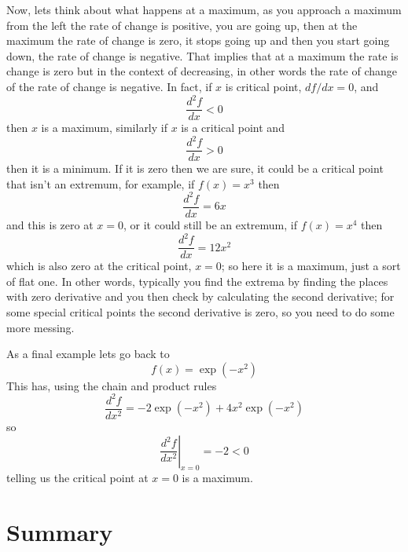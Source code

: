 \documentclass[12pt]{article}
\begin{document}
Now, lets think about what happens at a maximum, as you approach a
maximum from the left the rate of change is positive, you are going
up, then at the maximum the rate of change is zero, it stops going up
and then you start going down, the rate of change is negative. That
implies that at a maximum the rate is change is zero but in the
context of decreasing, in other words the rate of change of the rate
of change is negative. In fact, if $x$ is critical point, $df/dx=0$, and
\begin{equation}
  \frac{d^2f}{dx}<0
\end{equation}
then $x$ is a maximum, similarly if $x$ is a critical point and
\begin{equation}
  \frac{d^2f}{dx}>0
\end{equation}
then it is a minimum. If it is zero then we are sure, it could be a
critical point that isn't an extremum, for example, if $f(x)=x^3$ then
\begin{equation}
  \frac{d^2f}{dx}=6x
\end{equation}
and this is zero at $x=0$, or it could still be an extremum, if $f(x)=x^4$ then
\begin{equation}
  \frac{d^2f}{dx}=12x^2
\end{equation}
which is also zero at the critical point, $x=0$; so here it is a
maximum, just a sort of flat one. In other words, typically you find
the extrema by finding the places with zero derivative and you then
check by calculating the second derivative; for some special critical
points the second derivative is zero, so you need to do some more messing.

As a final example lets go back to
\begin{equation}
  f(x)=\exp{(-x^2)}
\end{equation}
This has, using the chain and product rules
\begin{equation}
  \frac{d^2f}{dx^2}=-2\exp{(-x^2)}+4x^2\exp{(-x^2)}
\end{equation}
so
\begin{equation}
  \left.\frac{d^2f}{dx^2}\right|_{x=0}=-2<0
\end{equation}
telling us the critical point at $x=0$ is a maximum.


\section*{Summary}
\end{document}
